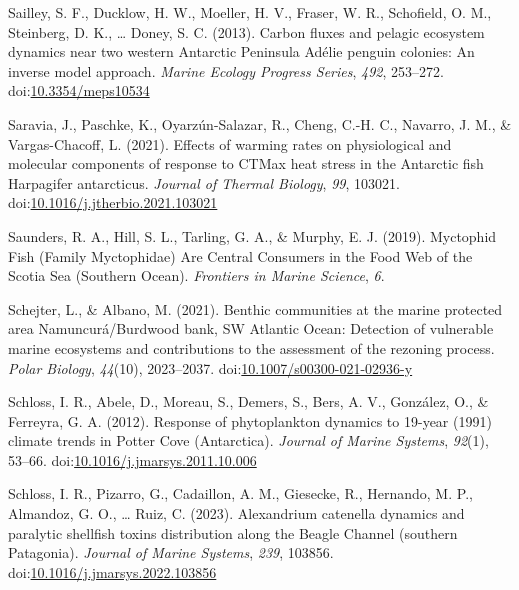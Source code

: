 \documentclass[
]{article}
\newlength{\cslhangindent}
\newlength{\cslentryspacingunit} %
\newenvironment{CSLReferences}[2] %
 {%
  \setlength{\parindent}{0pt}
  \ifodd #1
  \let\oldpar\par
  \def\par{\hangindent=\cslhangindent\oldpar}
  \fi
  \setlength{\parskip}{#2\cslentryspacingunit}
 }%
 {}
\begin{document}
\begin{CSLReferences}{1}{0}
\leavevmode{}%
Sailley, S. F., Ducklow, H. W., Moeller, H. V., Fraser, W. R.,
Schofield, O. M., Steinberg, D. K., \ldots{} Doney, S. C. (2013). Carbon
fluxes and pelagic ecosystem dynamics near two western {Antarctic
Peninsula Adélie} penguin colonies: An inverse model approach.
\emph{Marine Ecology Progress Series}, \emph{492}, 253--272.
doi:\href{https://doi.org/10.3354/meps10534}{10.3354/meps10534}

\leavevmode{}%
Saravia, J., Paschke, K., Oyarzún-Salazar, R., Cheng, C.-H. C., Navarro,
J. M., \& Vargas-Chacoff, L. (2021). Effects of warming rates on
physiological and molecular components of response to {CTMax} heat
stress in the {Antarctic} fish {Harpagifer} antarcticus. \emph{Journal
of Thermal Biology}, \emph{99}, 103021.
doi:\href{https://doi.org/10.1016/j.jtherbio.2021.103021}{10.1016/j.jtherbio.2021.103021}

\leavevmode{}%
Saunders, R. A., Hill, S. L., Tarling, G. A., \& Murphy, E. J. (2019).
Myctophid {Fish} ({Family Myctophidae}) {Are Central Consumers} in the
{Food Web} of the {Scotia Sea} ({Southern Ocean}). \emph{Frontiers in
Marine Science}, \emph{6}.

\leavevmode{}%
Schejter, L., \& Albano, M. (2021). Benthic communities at the marine
protected area {Namuncurá}/{Burdwood} bank, {SW Atlantic Ocean}:
Detection of vulnerable marine ecosystems and contributions to the
assessment of the rezoning process. \emph{Polar Biology}, \emph{44}(10),
2023--2037.
doi:\href{https://doi.org/10.1007/s00300-021-02936-y}{10.1007/s00300-021-02936-y}

\leavevmode{}%
Schloss, I. R., Abele, D., Moreau, S., Demers, S., Bers, A. V.,
González, O., \& Ferreyra, G. A. (2012). Response of phytoplankton
dynamics to 19-year (1991) climate trends in {Potter
Cove} ({Antarctica}). \emph{Journal of Marine Systems}, \emph{92}(1),
53--66.
doi:\href{https://doi.org/10.1016/j.jmarsys.2011.10.006}{10.1016/j.jmarsys.2011.10.006}

\leavevmode{}%
Schloss, I. R., Pizarro, G., Cadaillon, A. M., Giesecke, R., Hernando,
M. P., Almandoz, G. O., \ldots{} Ruiz, C. (2023). Alexandrium catenella
dynamics and paralytic shellfish toxins distribution along the {Beagle
Channel} (southern {Patagonia}). \emph{Journal of Marine Systems},
\emph{239}, 103856.
doi:\href{https://doi.org/10.1016/j.jmarsys.2022.103856}{10.1016/j.jmarsys.2022.103856}


\end{CSLReferences}
\end{document}
